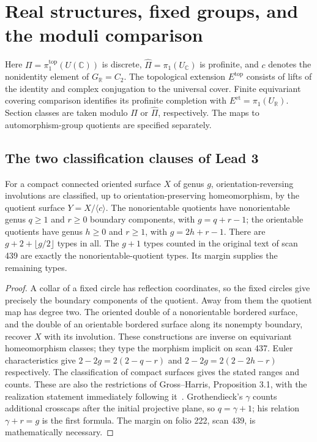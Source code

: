 \section{Real structures, fixed groups, and the moduli comparison}
\label{sec:C}
Here $\Pi=\pi_1^{\mathrm{top}}(U(\mathbb C))$ is discrete,
$\widehat\Pi=\pi_1(U_{\mathbb C})$ is profinite, and
$c$ denotes the nonidentity element of $G_{\mathbb R}=C_2$.
The topological extension $E^{\mathrm{top}}$ consists of
lifts of the identity and complex conjugation to the universal
cover. Finite equivariant covering comparison identifies its
profinite completion with $E^{\mathrm{et}}=\pi_1(U_{\mathbb R})$.
Section classes are taken modulo $\Pi$ or $\widehat\Pi$,
respectively. The maps to automorphism-group quotients are
specified separately.

\subsection{The two classification clauses of Lead 3}

\begin{proposition}
\label{C-classification}
For a compact connected oriented surface $X$ of genus $g$,
orientation-reversing involutions are classified, up to
orientation-preserving homeomorphism, by the quotient
surface $Y=X/\langle c\rangle$. The nonorientable quotients
have nonorientable genus $q\geq1$ and $r\geq0$ boundary
components, with $g=q+r-1$; the orientable quotients have
genus $h\geq0$ and $r\geq1$, with $g=2h+r-1$.
There are $g+2+\lfloor g/2\rfloor$ types in all.
The $g+1$ types counted in the original text of scan 439
are exactly the nonorientable-quotient types.
Its margin supplies the remaining types.
\end{proposition}
\begin{proof}
A collar of a fixed circle has reflection coordinates, so the
fixed circles give precisely the boundary components of the
quotient. Away from them the quotient map has degree two.
The oriented double of a nonorientable bordered surface,
and the double of an orientable bordered surface along its
nonempty boundary, recover $X$ with its involution.
These constructions are inverse on equivariant homeomorphism
classes; they type the morphism implicit on scan 437.
Euler characteristics give $2-2g=2(2-q-r)$ and
$2-2g=2(2-2h-r)$ respectively. The classification of compact
surfaces gives the stated ranges and counts.
These are also the restrictions of Gross--Harris,
Proposition 3.1, with the realization statement immediately
following it~\cite{GrossHarris1981}.
Grothendieck's $\gamma$ counts additional crosscaps after
the initial projective plane, so $q=\gamma+1$; his relation
$\gamma+r=g$ is the first formula. The margin on
folio 222, scan 439, is mathematically necessary.
\end{proof}

